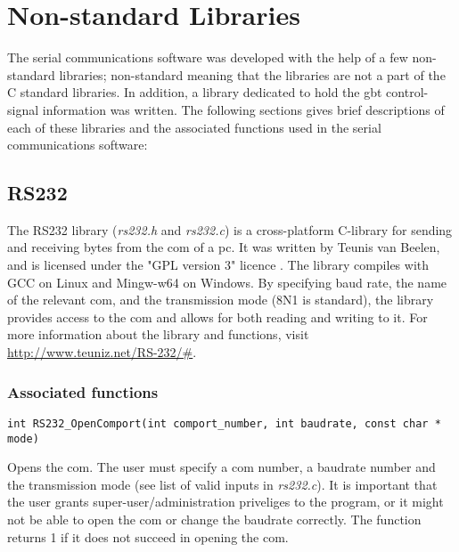 \documentclass[main.tex]{subfiles}
\begin{document}
\chapter{Non-standard Libraries} \label{chap:clibs}

The serial communications software was developed with the help of a few non-standard libraries; non-standard meaning that the libraries are not a part of the C standard libraries. In addition, a library dedicated to hold the \gls{gbt} control-signal information was written.
The following sections gives brief descriptions of each of these libraries and the associated functions used in the serial communications software:

\section{RS232} \label{sec:rs232}

The RS232 library (\textit{rs232.h} and \textit{rs232.c}) is a cross-platform C-library for sending and receiving bytes from the \gls{com} of a \acrshort{pc}. It was written by Teunis van Beelen, and is licensed under the "GPL version 3" licence \cite{gpl3}. The library compiles with GCC on Linux and Mingw-w64 on Windows. By specifying baud rate, the name of the relevant \gls{com}, and the transmission mode (8N1 is standard), the library provides access to the \gls{com} and allows for both reading and writing to it. For more information about the library and functions, visit \url{http://www.teuniz.net/RS-232/#}.

\subsection{Associated functions}


\begin{lstlisting}[frame=single] 
int RS232_OpenComport(int comport_number, int baudrate, const char * mode)
\end{lstlisting}
Opens the \gls{com}. The user must specify a \gls{com} number, a baudrate number and the transmission mode (see list of valid inputs in \textit{rs232.c}). It is important that the user grants super-user/administration priveliges to the program, or it might not be able to open the \gls{com} or change the baudrate correctly. The function returns 1 if it does not succeed in opening the \gls{com}.\\
\end{document}
